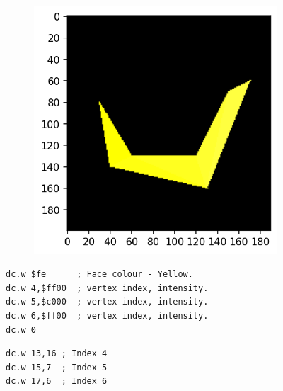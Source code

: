 \begin{figure}[H]
  \centering
  \begin{adjustbox}{width=13cm,center}
    \begin{minipage}[c]{0.48\linewidth}
      \begin{figure}[H]
        \centering
        \begin{adjustbox}{width=5.5cm,center}
          \includegraphics[width=12cm]{src/build_t2k_claws/claw_face_5.png}%
        \end{adjustbox}
      \end{figure}
    \end{minipage}
    \begin{minipage}[c]{0.48\linewidth}
      \begin{lstlisting}[basicstyle=\scriptsize\ttfamily]
dc.w $fe      ; Face colour - Yellow.
dc.w 4,$ff00  ; vertex index, intensity.
dc.w 5,$c000  ; vertex index, intensity.
dc.w 6,$ff00  ; vertex index, intensity.
dc.w 0
      \end{lstlisting}
      \begin{lstlisting}[basicstyle=\scriptsize\ttfamily]
dc.w 13,16 ; Index 4
dc.w 15,7  ; Index 5
dc.w 17,6  ; Index 6
      \end{lstlisting}
      \vspace*{\fill}
    \end{minipage}
  \end{adjustbox}
\end{figure}

